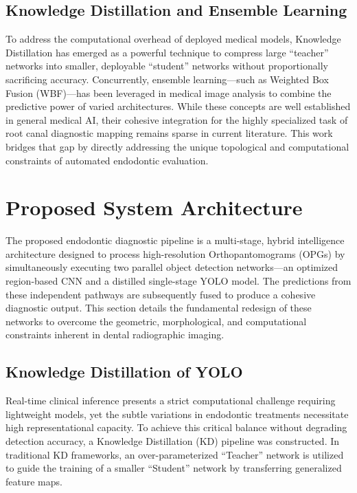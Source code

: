 \documentclass[conference]{IEEEtran}
\begin{document}
\subsection{Knowledge Distillation and Ensemble Learning}
To address the computational overhead of deployed medical models, Knowledge Distillation has emerged as a powerful technique to compress large ``teacher'' networks into smaller, deployable ``student'' networks without proportionally sacrificing accuracy. Concurrently, ensemble learning---such as Weighted Box Fusion (WBF)---has been leveraged in medical image analysis to combine the predictive power of varied architectures. While these concepts are well established in general medical AI, their cohesive integration for the highly specialized task of root canal diagnostic mapping remains sparse in current literature. This work bridges that gap by directly addressing the unique topological and computational constraints of automated endodontic evaluation.

\section{Proposed System Architecture}

The proposed endodontic diagnostic pipeline is a multi-stage, hybrid intelligence architecture designed to process high-resolution Orthopantomograms (OPGs) by simultaneously executing two parallel object detection networks---an optimized region-based CNN and a distilled single-stage YOLO model. The predictions from these independent pathways are subsequently fused to produce a cohesive diagnostic output. This section details the fundamental redesign of these networks to overcome the geometric, morphological, and computational constraints inherent in dental radiographic imaging.

\subsection{Knowledge Distillation of YOLO}
Real-time clinical inference presents a strict computational challenge requiring lightweight models, yet the subtle variations in endodontic treatments necessitate high representational capacity. To achieve this critical balance without degrading detection accuracy, a Knowledge Distillation (KD) pipeline was constructed. In traditional KD frameworks, an over-parameterized ``Teacher'' network is utilized to guide the training of a smaller ``Student'' network by transferring generalized feature maps. 
\end{document}

